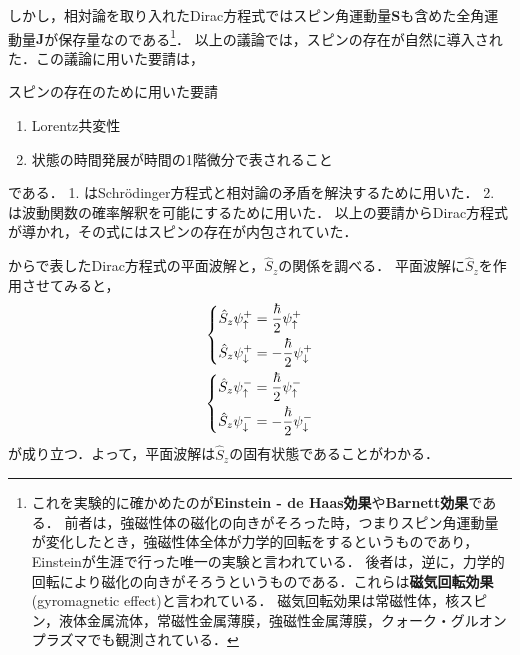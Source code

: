 \documentclass{report}
\begin{document}
  しかし，相対論を取り入れたDirac方程式ではスピン角運動量$\bm{S}$も含めた全角運動量$\bm{J}$が保存量なのである\footnote{
    これを実験的に確かめたのが\textbf{Einstein - de Haas効果}や\textbf{Barnett効果}である．
    前者は，強磁性体の磁化の向きがそろった時，つまりスピン角運動量が変化したとき，強磁性体全体が力学的回転をするというものであり，Einsteinが生涯で行った唯一の実験と言われている．
    後者は，逆に，力学的回転により磁化の向きがそろうというものである．これらは\textbf{磁気回転効果}(gyromagnetic effect)と言われている．
    磁気回転効果は常磁性体，核スピン，液体金属流体，常磁性金属薄膜，強磁性金属薄膜，クォーク・グルオンプラズマでも観測されている．
  }．
  以上の議論では，スピンの存在が自然に導入された．この議論に用いた要請は，
  \begin{itembox}[l]{スピンの存在のために用いた要請}
    \begin{enumerate}
      \item Lorentz共変性
      \item 状態の時間発展が時間の1階微分で表されること
    \end{enumerate}
  \end{itembox}
  である．
  1. はSchrödinger方程式と相対論の矛盾を解決するために用いた．
  2. は波動関数の確率解釈を可能にするために用いた．
  以上の要請からDirac方程式が導かれ，その式にはスピンの存在が内包されていた．
  \par
  からで表したDirac方程式の平面波解と，$\hat{S}_z$の関係を調べる．
  平面波解に$\hat{S}_z$を作用させてみると，
  \begin{align}
    \begin{dcases}
      \hat{S}_z \psi^{+}_{\uparrow} = \frac{\hbar}{2}\psi^{+}_{\uparrow}\\
      \hat{S}_z \psi^{+}_{\downarrow} = -\frac{\hbar}{2}\psi^{+}_{\downarrow}
    \end{dcases}\\
    \begin{dcases}
      \hat{S}_z \psi^{-}_{\uparrow} = \frac{\hbar}{2}\psi^{-}_{\uparrow}\\
      \hat{S}_z \psi^{-}_{\downarrow} = -\frac{\hbar}{2}\psi^{-}_{\downarrow}
    \end{dcases}
  \end{align}
  が成り立つ．よって，平面波解は$\hat{S}_z$の固有状態であることがわかる．
\end{document}
